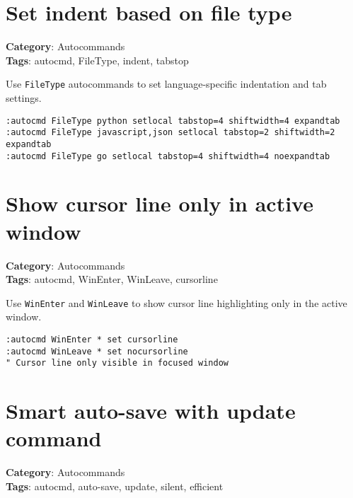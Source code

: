 {\section{Set indent based on file type}

\textbf{Category}: Autocommands\\ \textbf{Tags}: autocmd, FileType, indent, tabstop
\vspace{0.5cm}

Use {\footnotesize \Verb§FileType§} autocommands to set language-specific indentation and tab settings.

\begin{Exa*}{}
\begin{Verbatim}[fontsize=\footnotesize, breaklines, breakanywhere]
:autocmd FileType python setlocal tabstop=4 shiftwidth=4 expandtab
:autocmd FileType javascript,json setlocal tabstop=2 shiftwidth=2 expandtab
:autocmd FileType go setlocal tabstop=4 shiftwidth=4 noexpandtab
\end{Verbatim}
\end{Exa*}

\section{Show cursor line only in active window}

\textbf{Category}: Autocommands\\ \textbf{Tags}: autocmd, WinEnter, WinLeave, cursorline
\vspace{0.5cm}

Use {\footnotesize \Verb§WinEnter§} and {\footnotesize \Verb§WinLeave§} to show cursor line highlighting only in the active window.

\begin{Exa*}{}
\begin{Verbatim}[fontsize=\footnotesize, breaklines, breakanywhere]
:autocmd WinEnter * set cursorline
:autocmd WinLeave * set nocursorline
" Cursor line only visible in focused window
\end{Verbatim}
\end{Exa*}

\section{Smart auto-save with update command}

\textbf{Category}: Autocommands\\ \textbf{Tags}: autocmd, auto-save, update, silent, efficient
\vspace{0.5cm}

}
